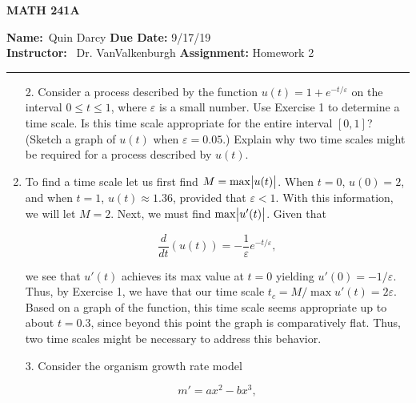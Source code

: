 \documentclass[12pt]{article}
\makeatletter
\theoremstyle{definition}
\theoremstyle{remark}
\newenvironment{solution}[1][\bf{\textit{Solution}}]{\par
  
  \normalfont \topsep6\p@\@plus6\p@\relax
  \list{}{\leftmargin=0mm
          \rightmargin=0mm
          \settowidth{\itemindent}{\itshape#1}%
          \labelwidth=\itemindent
          \parsep=0pt \listparindent=\parindent 
  }
  \item[\hskip\labelsep
        \itshape
    #1\@addpunct{.}]\ignorespaces
}{%
  \popQED\endlist\@endpefalse
}
\makeatother
\begin{document}
\begin{center}
	\vspace{.4cm} {\textbf { \large MATH 241A}}
\end{center}
{\textbf{Name:}\ Quin Darcy \hspace{\fill} \textbf{Due Date:} 9/17/19   \\
{ \textbf{Instructor:}} \ Dr. VanValkenburgh \hspace{\fill} \textbf{Assignment:} Homework 2 \\ \hrule}

\justifying

\begin{enumerate}[leftmargin=*]
    \item[2.] Consider a process described by the function $u(t)=1+e^{-t/\varepsilon}$ on the interval $0\leq t\leq 1$, where $\varepsilon$ is a small number. Use Exercise 1 to determine a time scale. Is this time scale appropriate for the entire interval $[0,1]$? (Sketch a graph of $u(t)$ when $\varepsilon=0.05$.) Explain why two time scales might be required for a process described by $u(t)$.
    
    \begin{solution}
        To find a time scale let us first find $M=\max\abs{u(t)}$. When $t=0$, $u(0)=2$, and when $t=1$, $u(t)\approx 1.36$, provided that $\varepsilon<1$. With this information, we will let $M=2$. Next, we must find $\max\abs{u'(t)}$. Given that 
        
        \begin{equation*}
            \frac{d}{dt}(u(t))=-\frac{1}{\varepsilon}e^{-t/\varepsilon}, 
        \end{equation*}
        
        we see that $u'(t)$ achieves its max value at $t=0$ yielding $u'(0)=-1/\varepsilon$. Thus, by Exercise 1, we have that our time scale $t_c=M/\max{u'(t)}=2\varepsilon$. Based on a graph of the function, this time scale seems appropriate up to about $t=0.3$, since beyond this point the graph is comparatively flat. Thus, two time scales might be necessary to address this behavior.
    \end{solution}
    
    \item[3.] Consider the organism growth rate model 
    
    \begin{equation}
        m'=ax^2-bx^3,
    \end{equation}
    

\end{enumerate}
\end{document}
